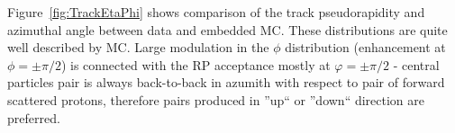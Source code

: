Figure~\ref{fig:TrackEtaPhi} shows comparison of the track pseudorapidity and azimuthal angle between data and embedded MC. These distributions are quite well described by MC. Large modulation in the $\phi$ distribution (enhancement at $\phi=\pm\pi/2$) is connected with the RP acceptance mostly at $\varphi=\pm\pi/2$ - central particles pair is always back-to-back in azumith with respect to pair of forward scattered protons, therefore pairs produced in ''up`` or ''down`` direction are preferred.

\begin{figure}[hb]
\centering
\parbox{0.4725\textwidth}{
  \centering
  \begin{subfigure}[b]{\linewidth}
  \end{subfigure}\\
}
\end{figure}
